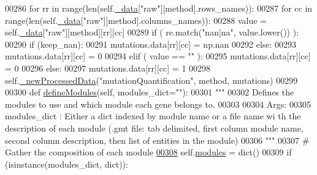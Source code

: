 \begin{DoxyCode}
00286             \textcolor{keywordflow}{for} rr \textcolor{keywordflow}{in} range(len(self.\hyperlink{classnavicom_1_1navicom_1_1NaviCom_a407b2b5c30a5652ee85c4be54b3e6679}{_data}[\textcolor{stringliteral}{"raw"}][method].rows\_names)):
00287                 \textcolor{keywordflow}{for} cc \textcolor{keywordflow}{in} range(len(self.\hyperlink{classnavicom_1_1navicom_1_1NaviCom_a407b2b5c30a5652ee85c4be54b3e6679}{_data}[\textcolor{stringliteral}{"raw"}][method].columns\_names)):
00288                     value = self.\hyperlink{classnavicom_1_1navicom_1_1NaviCom_a407b2b5c30a5652ee85c4be54b3e6679}{_data}[\textcolor{stringliteral}{"raw"}][method][rr][cc]
00289                     \textcolor{keywordflow}{if} ( re.match(\textcolor{stringliteral}{"nan|na"}, value.lower()) ):
00290                         \textcolor{keywordflow}{if} (keep\_nan):
00291                             mutations.data[rr][cc] = np.nan
00292                         \textcolor{keywordflow}{else}:
00293                             mutations.data[rr][cc] = 0
00294                     \textcolor{keywordflow}{elif} ( value == \textcolor{stringliteral}{""} ):
00295                         mutations.data[rr][cc] = 0
00296                     \textcolor{keywordflow}{else}:
00297                         mutations.data[rr][cc] = 1
00298             self.\hyperlink{classnavicom_1_1navicom_1_1NaviCom_acf8b9094fa76cafefb910daeb68b7e5d}{_newProcessedData}(\textcolor{stringliteral}{"mutationQuantification"}, method, mutations)
00299 
00300     \textcolor{keyword}{def }\hyperlink{classnavicom_1_1navicom_1_1NaviCom_a6411b52971f15bd11270942cb98eaa1a}{defineModules}(self, modules\_dict=""):
00301         \textcolor{stringliteral}{"""}
00302 \textcolor{stringliteral}{        Defines the modules to use and which module each gene belongs to.}
00303 \textcolor{stringliteral}{}
00304 \textcolor{stringliteral}{        Args:}
00305 \textcolor{stringliteral}{            modules\_dict : Either a dict indexed by module name or a file name wi
      th the description of each module (.gmt file: tab delimited, first column module 
      name, second column description, then list of entities in the module)}
00306 \textcolor{stringliteral}{        """}
00307         \textcolor{comment}{# Gather the composition of each module}
\hypertarget{navicom_8py_source_l00308}{}\hyperlink{classnavicom_1_1navicom_1_1NaviCom_a6411b52971f15bd11270942cb98eaa1a}{00308}         self.\hyperlink{classnavicom_1_1navicom_1_1NaviCom_a56141660ddf29a36a8291e938246578c}{modules} = dict()
00309         \textcolor{keywordflow}{if} (isinstance(modules\_dict, dict)):

\end{DoxyCode}
